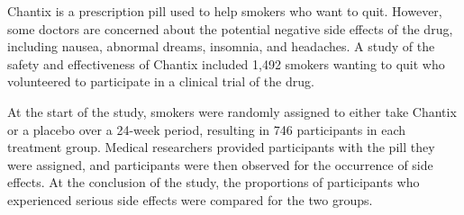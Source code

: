 \documentclass[noanswers]{exam}
\begin{document}
\begin{questions}
\begin{solution}[\stretch{1}]
		\end{solution}
	
\newpage	
	
	\question Chantix is a prescription pill used to help smokers who want to quit. However, some doctors are concerned about the potential negative side effects of the drug, including nausea, abnormal dreams, insomnia, and headaches. A study of the safety and effectiveness of Chantix included 1,492 smokers wanting to quit who volunteered to participate in a clinical trial of the drug.

\vspace{2mm}

At the start of the study, smokers were randomly assigned to either take Chantix or a placebo over a 24-week period, resulting in 746 participants in each treatment group. Medical researchers provided participants with the pill they were assigned, and participants were then observed for the occurrence of side effects. At the conclusion of the study, the proportions of participants who experienced serious side effects were compared for the two groups.

\vspace{3mm}

\end{questions}
\end{document}

